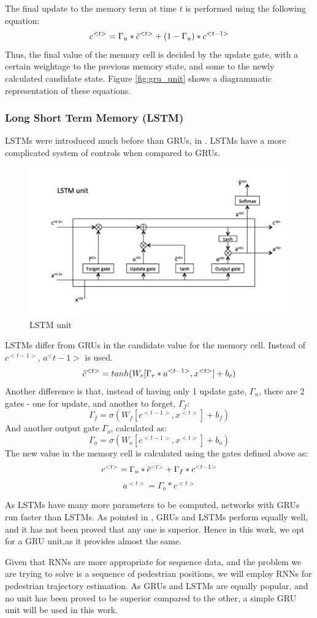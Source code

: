  The final update to the memory term at time \(t\) is performed using the following equation:
 \[c^{<t>}=\Gamma_u*\Tilde{c}^{<t>} + (1-\Gamma_u)*{c}^{<t-1>} \]
 Thus, the final value of the memory cell is decided by the update gate, with a certain weightage to the previous memory state, and some to the newly calculated candidate state. Figure \ref{fig:gru_unit} shows a diagrammatic representation of these equations.
 

\subsubsection{Long Short Term Memory (LSTM)}
LSTMs were introduced much before than GRUs, in \cite{hochreiter_long_1997}. LSTMs have a more complicated system of controls when compared to GRUs.
 \begin{figure}[h]
    \centering
    \includegraphics[height=0.25\paperheight]{Figures/LSTM_cell.png}
    \caption{LSTM unit\cite{cavaioni_deeplearning_2018}}
    \label{fig:LSTM cell}
\end{figure}

LSTMs differ from GRUs in the candidate value for the memory cell. Instead of \(c^{<t-1>}\), \(a^<t-1>\) is used.
\[\Tilde{c}^{<t>}=tanh(W_c[\Gamma_r*a^{<t-1>},x^{<t>}]+b_c)\]
Another difference is that, instead of having only 1 update gate, \(\Gamma_u\), there are 2 gates - one for update, and another to forget, \(\Gamma_f\):
\[\Gamma_f = \sigma(W_f[c^{<t-1>},x^{<t>}]+b_f)\]
And another output gate \(\Gamma_o\), calculated as:
\[\Gamma_o = \sigma(W_o[c^{<t-1>},x^{<t>}]+b_o)\]
The new value in the memory cell is calculated using the gates defined above as:
 \[c^{<t>}=\Gamma_u*\Tilde{c}^{<t>} + \Gamma_f*{c}^{<t-1>} \]
 \[a^{<t>}=\Gamma_o*c^{<t>}\]

As LSTMs have many more parameters to be computed, networks with GRUs run faster than LSTMs. As pointed in \cite{chung_empirical_2014}, GRUs and LSTMs perform equally well, and it has not been proved that any one is superior. Hence in this work, we opt for a GRU unit,as it provides almost the same.

Given that RNNs are more appropriate for sequence data, and the problem we are trying to solve is a sequence of pedestrian positions, we will employ RNNs for pedestrian trajectory estimation. As GRUs and LSTMs are equally popular, and no unit has been proved to be superior compared to the other, a simple GRU unit will be used in this work.